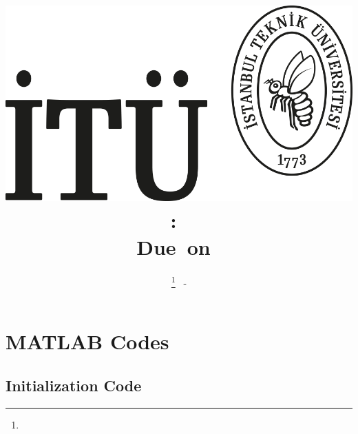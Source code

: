 \documentclass[12pt]{article}
\title{
	\includegraphics[width=0.5\linewidth]{./fig/itu_logo}\\	
	\vspace{.5in}
	\textmd{\textbf{\hmwkClass:\ \hmwkTitle}}\\
	\normalsize\vspace{0.1in}\small{Due\ on\ \hmwkDueDate}\\
	\vspace{0.1in}\large{\textit{\hmwkClassInstructor}}
	\vspace{1in}
}
\author{
	\textbf{\hmwkAuthorNameI}\thanks{\hmwkAuthorEmailI} \ - \textbf{\hmwkAuthorIDI} \\
	}
\date{} %
\begin{document}
\maketitle



\newpage
\thispagestyle{empty} %
\tableofcontents
\newpage 
{} 














\newpage




\newpage
\appendix

\section{MATLAB Codes}

\subsection{Initialization Code} \label{App_Int}


\end{document}
